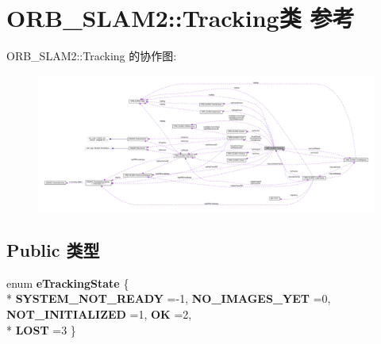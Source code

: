 \hypertarget{classORB__SLAM2_1_1Tracking}{\section{O\-R\-B\-\_\-\-S\-L\-A\-M2\-:\-:Tracking类 参考}
\label{classORB__SLAM2_1_1Tracking}
}


O\-R\-B\-\_\-\-S\-L\-A\-M2\-:\-:Tracking 的协作图\-:
\nopagebreak
\begin{figure}[H]
\begin{center}
\leavevmode
\includegraphics[width=350pt]{classORB__SLAM2_1_1Tracking__coll__graph}
\end{center}
\end{figure}
\subsection*{Public 类型}
\begin{DoxyCompactItemize}
\item 
enum {\bfseries e\-Tracking\-State} \{ \\*
{\bfseries S\-Y\-S\-T\-E\-M\-\_\-\-N\-O\-T\-\_\-\-R\-E\-A\-D\-Y} =-\/1, 
{\bfseries N\-O\-\_\-\-I\-M\-A\-G\-E\-S\-\_\-\-Y\-E\-T} =0, 
{\bfseries N\-O\-T\-\_\-\-I\-N\-I\-T\-I\-A\-L\-I\-Z\-E\-D} =1, 
{\bfseries O\-K} =2, 
\\*
{\bfseries L\-O\-S\-T} =3
 \}
\end{DoxyCompactItemize}
